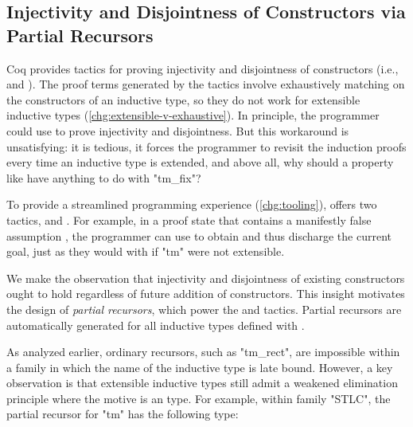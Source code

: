 \subsection{Injectivity and Disjointness of Constructors via Partial Recursors}


Coq provides tactics for proving injectivity and disjointness of constructors
(i.e.,  and ).
The proof terms generated by the tactics involve exhaustively
matching on the constructors of an inductive type, so
they do not work for extensible inductive types (\ref{chg:extensible-v-exhaustive}).
%
In principle, the programmer could use  to prove
injectivity and disjointness.
But this workaround is unsatisfying:
it is tedious, it forces the programmer to revisit
the induction proofs every time an inductive type is extended,
and above all, why should a property like
 have anything to do with "tm_fix"?

To provide a streamlined programming experience (\ref{chg:tooling}),
\Lang offers two tactics,  and .
For example, in a proof state that contains a manifestly false assumption
, the programmer can use
 to obtain  and thus discharge
the current goal, just as they would with  if "tm"
were not extensible.



We make the observation
that injectivity and disjointness of existing constructors ought to hold
regardless of future addition of constructors.
%
This insight motivates the design of \emph{partial recursors}, which
power the  and  tactics.
Partial recursors are automatically generated for all inductive types
defined with .

As analyzed earlier, ordinary recursors, such as "tm_rect", are impossible
within a family in which the name of the inductive type is late bound.
However,
a key observation is that extensible inductive types still admit a
weakened elimination principle where the motive is an  type.
For example, within family "STLC", the partial recursor for
"tm" has the following type:

